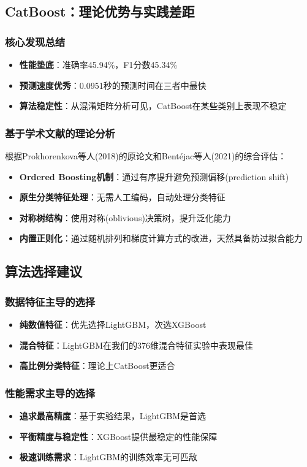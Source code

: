 \documentclass[UTF8]{report}
\theoremstyle{MyLineTheoremStyle} %
\theoremstyle{MyBlockTheoremStyle} %
\theoremstyle{MySubsubsectionStyle} %
\begin{document}
\subsection{CatBoost：理论优势与实践差距}
\subsubsection{核心发现总结}
\begin{itemize}
    \item \textbf{性能垫底}：准确率45.94\%，F1分数45.34\%
    \item \textbf{预测速度优秀}：0.0951秒的预测时间在三者中最快
    \item \textbf{算法稳定性}：从混淆矩阵分析可见，CatBoost在某些类别上表现不稳定
\end{itemize}

\subsubsection{基于学术文献的理论分析}
根据Prokhorenkova等人(2018)的原论文和Bentéjac等人(2021)的综合评估：
\begin{itemize}
    \item \textbf{Ordered Boosting机制}：通过有序提升避免预测偏移(prediction shift)
    \item \textbf{原生分类特征处理}：无需人工编码，自动处理分类特征
    \item \textbf{对称树结构}：使用对称(oblivious)决策树，提升泛化能力
    \item \textbf{内置正则化}：通过随机排列和梯度计算方式的改进，天然具备防过拟合能力
\end{itemize}

\subsection{算法选择建议}
\subsubsection{数据特征主导的选择}
\begin{itemize}
    \item \textbf{纯数值特征}：优先选择LightGBM，次选XGBoost
    \item \textbf{混合特征}：LightGBM在我们的376维混合特征实验中表现最佳
    \item \textbf{高比例分类特征}：理论上CatBoost更适合
\end{itemize}

\subsubsection{性能需求主导的选择}
\begin{itemize}
    \item \textbf{追求最高精度}：基于实验结果，LightGBM是首选
    \item \textbf{平衡精度与稳定性}：XGBoost提供最稳定的性能保障
    \item \textbf{极速训练需求}：LightGBM的训练效率无可匹敌
\end{itemize}
\end{document}
